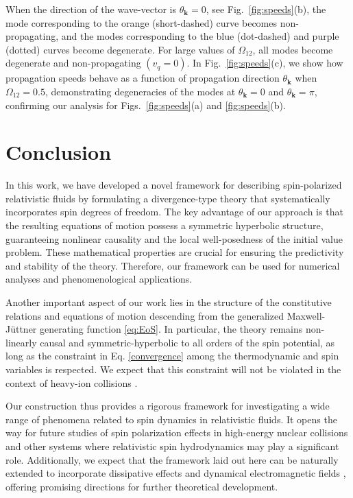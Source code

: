\documentclass[12pt,aps,prd,nofootinbib,noshowkeys,noshowpacs,longbibliography,
superscriptaddress,tightenlines,floatfix,preprintnumbers]{revtex4-2}
\begin{document}
When the direction of the wave-vector is $\theta_{\bm k}=0$, see Fig.~\ref{fig:speeds}(b), the mode corresponding to the orange (short-dashed) curve becomes non-propagating, and the modes corresponding to the blue (dot-dashed) and purple (dotted) curves become degenerate. For large values of $\Omega_{12}$, all modes become degenerate and non-propagating $(v_q=0)$.
In Fig.~\ref{fig:speeds}(c), we show how propagation speeds behave as a function of propagation direction $\theta_{\bm k}$ when $\Omega_{12} = 0.5$, demonstrating degeneracies of the modes at $\theta_{\bm k} = 0$ and $\theta_{\bm k}=\pi$, confirming our analysis for Figs.~\ref{fig:speeds}(a) and \ref{fig:speeds}(b).
\section{Conclusion}
\label{sec:conclude}
In this work, we have developed a novel framework for describing spin-polarized relativistic fluids by formulating a divergence-type theory that systematically incorporates spin degrees of freedom. The key advantage of our approach is that the resulting equations of motion possess a symmetric hyperbolic structure, guaranteeing nonlinear causality and the local well-posedness of the initial value problem. These mathematical properties are crucial for ensuring the predictivity and stability of the theory. Therefore, our framework can be used for numerical analyses and phenomenological applications. 

Another important aspect of our work lies in the structure of the constitutive relations and equations of motion descending from the generalized Maxwell-J\"uttner generating function \eqref{eq:EoS}. In particular, the theory remains non-linearly causal and symmetric-hyperbolic to all orders of the spin potential, as long as the constraint in Eq. \eqref{convergence} among the thermodynamic and spin variables is respected. We expect that this constraint will not be violated in the context of heavy-ion collisions \cite{Becattini:2020ngo,Das:2022lqh,Arslandok:2023utm,Becattini:2024uha,Niida:2024ntm}.

Our construction thus provides a rigorous framework for investigating a wide range of phenomena related to spin dynamics in relativistic fluids. It opens the way for future studies of spin polarization effects in high-energy nuclear collisions and other systems where relativistic spin hydrodynamics may play a significant role. {\color{black}Additionally, we expect that the framework laid out here can be naturally extended to incorporate dissipative effects and dynamical electromagnetic fields \cite{Israel:1978up, Singh:2022ltu, Bhadury:2022ulr}, offering promising directions for further theoretical development.}
\end{document}
